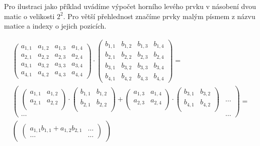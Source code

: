 Pro ilustraci jako příklad uvádíme výpočet horního levého prvku v násobení dvou matic o velikosti $ 2^{2} $. Pro větší přehlednost značíme prvky malým písmem z názvu matice a indexy o jejich pozicích.

\begin{align}
\begin{pmatrix}
a_{1,1} & a_{1,2} & a_{1,3} & a_{1,4} \\
a_{2,1} & a_{2,2} & a_{2,3} & a_{2,4} \\
a_{3,1} & a_{3,2} & a_{3,3} & a_{3,4} \\
a_{4,1} & a_{4,2} & a_{4,3} & a_{4,4}
\end{pmatrix} \cdot \begin{pmatrix}
b_{1,1} & b_{1,2} & b_{1,3} & b_{1,4} \\
b_{2,1} & b_{2,2} & b_{2,3} & b_{2,4} \\
b_{3,1} & b_{3,2} & b_{3,3} & b_{3,4} \\
b_{4,1} & b_{4,2} & b_{4,3} & b_{4,4}
\end{pmatrix} = \\
\begin{pmatrix}
\begin{pmatrix}
 a_{1,1} & a_{1,2} \\
 a_{2,1} & a_{2,2} \\
\end{pmatrix} \cdot
\begin{pmatrix}
 b_{1,1} & b_{1,2} \\
 b_{2,1} & b_{2,2} \\
\end{pmatrix} + 
\begin{pmatrix}
 a_{1,3} & a_{1,4} \\
 a_{2,3} & a_{2,4} \\
\end{pmatrix} \cdot 
\begin{pmatrix}
 b_{3,1} & b_{3,2} \\
 b_{4,1} & b_{4,2} \\
\end{pmatrix} &
\hdots \\
\hdots & \hdots
\end{pmatrix} = \\
\begin{pmatrix}
\begin{pmatrix}
 a_{1,1} b_{1,1}+a_{1,2} b_{2,1} & \hdots \\
 \hdots & \hdots

\end{pmatrix}
\end{pmatrix}
\end{align}
